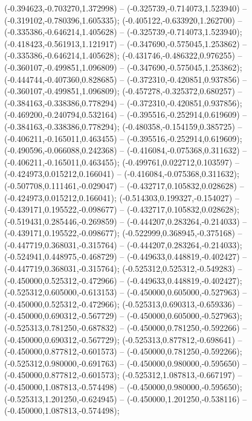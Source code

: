  (-0.394623,-0.703270,1.372998) -- (-0.325739,-0.714073,1.523940) -- (-0.319102,-0.780396,1.605335);
 (-0.405122,-0.633920,1.262700) -- (-0.335386,-0.646214,1.405628) -- (-0.325739,-0.714073,1.523940);
 (-0.418423,-0.561913,1.121917) -- (-0.347690,-0.575045,1.253862) -- (-0.335386,-0.646214,1.405628);
 (-0.431746,-0.486322,0.976255) -- (-0.360107,-0.499851,1.096809) -- (-0.347690,-0.575045,1.253862);
 (-0.444744,-0.407360,0.828685) -- (-0.372310,-0.420851,0.937856) -- (-0.360107,-0.499851,1.096809);
 (-0.457278,-0.325372,0.680257) -- (-0.384163,-0.338386,0.778294) -- (-0.372310,-0.420851,0.937856);
 (-0.469200,-0.240794,0.532164) -- (-0.395516,-0.252914,0.619609) -- (-0.384163,-0.338386,0.778294);
 (-0.480358,-0.154159,0.385725) -- (-0.406211,-0.165011,0.463455) -- (-0.395516,-0.252914,0.619609);
 (-0.490596,-0.066088,0.242368) -- (-0.416084,-0.075368,0.311632) -- (-0.406211,-0.165011,0.463455);
 (-0.499761,0.022712,0.103597) -- (-0.424973,0.015212,0.166041) -- (-0.416084,-0.075368,0.311632);
 (-0.507708,0.111461,-0.029047) -- (-0.432717,0.105832,0.028628) -- (-0.424973,0.015212,0.166041);
 (-0.514303,0.199327,-0.154027) -- (-0.439171,0.195522,-0.098677) -- (-0.432717,0.105832,0.028628);
 (-0.519431,0.285446,-0.269859) -- (-0.444207,0.283264,-0.214033) -- (-0.439171,0.195522,-0.098677);
 (-0.522999,0.368945,-0.375168) -- (-0.447719,0.368031,-0.315764) -- (-0.444207,0.283264,-0.214033);
 (-0.524941,0.448975,-0.468729) -- (-0.449633,0.448819,-0.402427) -- (-0.447719,0.368031,-0.315764);
 (-0.525312,0.525312,-0.549283) -- (-0.450000,0.525312,-0.472966) -- (-0.449633,0.448819,-0.402427);
 (-0.525312,0.605000,-0.613153) -- (-0.450000,0.605000,-0.527963) -- (-0.450000,0.525312,-0.472966);
 (-0.525313,0.690313,-0.659336) -- (-0.450000,0.690312,-0.567729) -- (-0.450000,0.605000,-0.527963);
 (-0.525313,0.781250,-0.687832) -- (-0.450000,0.781250,-0.592266) -- (-0.450000,0.690312,-0.567729);
 (-0.525313,0.877812,-0.698641) -- (-0.450000,0.877812,-0.601573) -- (-0.450000,0.781250,-0.592266);
 (-0.525312,0.980000,-0.691763) -- (-0.450000,0.980000,-0.595650) -- (-0.450000,0.877812,-0.601573);
 (-0.525312,1.087813,-0.667197) -- (-0.450000,1.087813,-0.574498) -- (-0.450000,0.980000,-0.595650);
 (-0.525313,1.201250,-0.624945) -- (-0.450000,1.201250,-0.538116) -- (-0.450000,1.087813,-0.574498);
